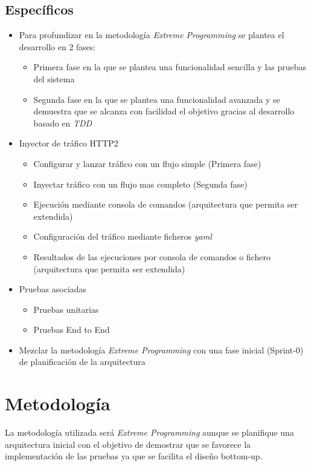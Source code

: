 \subsection{Específicos}
\begin{itemize}
    \item Para profundizar en la metodología \emph{Extreme Programming} se plantea el desarrollo en 2 fases:
    \begin{itemize}
        \item Primera fase en la que se plantea una funcionalidad sencilla y las pruebas del sistema
        \item Segunda fase en la que se plantea una funcionalidad avanzada y se demuestra que se alcanza con facilidad el objetivo gracias al desarrollo basado en \emph{TDD}
    \end{itemize}
    \item Inyector de tráfico HTTP2
    \begin{itemize}
        \item Configurar y lanzar tráfico con un flujo simple (Primera fase)
        \item Inyectar tráfico con un flujo mas completo (Segunda fase)
        \item Ejecución mediante consola de comandos (arquitectura que permita ser extendida)
        \item Configuración del tráfico mediante ficheros \emph{yaml}
        \item Resultados de las ejecuciones por consola de comandos o fichero (arquitectura que permita ser extendida)
    \end{itemize}
    \item Pruebas asociadas
    \begin{itemize}
        \item Pruebas unitarias
        \item Pruebas End to End
    \end{itemize}
    \item Mezclar la metodología \emph{Extreme Programming} con una fase inicial (Sprint-0) de planificación de la arquitectura\cite{design dead}
\end{itemize}

\section{Metodología}
La metodología utilizada será \emph{Extreme Programming} aunque se planifique una arquitectura inicial con el objetivo
de demostrar que se favorece la implementación de las pruebas ya que se facilita el diseño bottom-up.


